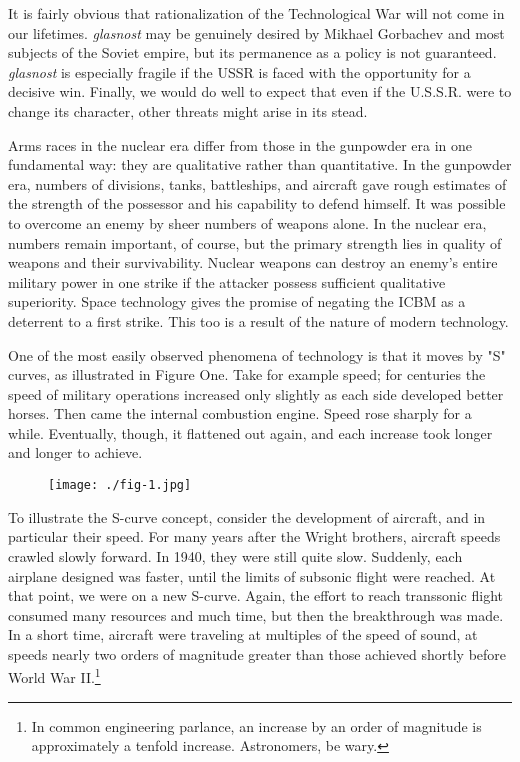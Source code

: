 It is fairly obvious that rationalization of the Technological War will not come in our lifetimes. \textit{glasnost} may be genuinely desired by Mikhael Gorbachev and most subjects of the Soviet empire, but its permanence as a policy is not guaranteed. \textit{glasnost} is especially fragile if the USSR is faced with the opportunity for a decisive win. Finally, we would do well to expect that even if the U.S.S.R. were to change its character, other threats might arise in its stead.

Arms races in the nuclear era differ from those in the gunpowder era in one fundamental way: they are qualitative rather than quantitative. In the gunpowder era, numbers of divisions, tanks, battleships, and aircraft gave rough estimates of the strength of the possessor and his capability to defend himself. It was possible to overcome an enemy by sheer numbers of weapons alone. In the nuclear era, numbers remain important, of course, but the primary strength lies in quality of weapons and their survivability. Nuclear weapons can destroy an enemy's entire military power in one strike if the attacker possess sufficient qualitative superiority. Space technology gives the promise of negating the ICBM as a deterrent to a first strike. This too is a result of the nature of modern technology.

One of the most easily observed phenomena of technology is that it moves by "S" curves, as illustrated in Figure One. Take for example speed; for centuries the speed of military operations increased only slightly as each side developed better horses. Then came the internal combustion engine. Speed rose sharply for a while. Eventually, though, it flattened out again, and each increase took longer and longer to achieve.
\begin{figure}
    \texttt{[image: ./fig-1.jpg]}
    \label{fig:S-Curve}
\end{figure}

To illustrate the S-curve concept, consider the development of aircraft, and in particular their speed. For many years after the Wright brothers, aircraft speeds crawled slowly forward. In 1940, they were still quite slow. Suddenly, each airplane designed was faster, until the limits of subsonic flight were reached. At that point, we were on a new S-curve. Again, the effort to reach transsonic flight consumed many resources and much time, but then the breakthrough was made. In a short time, aircraft were traveling at multiples of the speed of sound, at speeds nearly two orders of magnitude greater than those achieved shortly before World War II.\footnote{In common engineering parlance, an increase by an order of magnitude is approximately a tenfold increase. Astronomers, be wary.}

